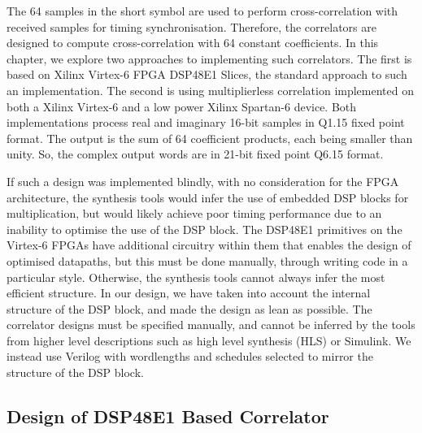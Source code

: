 The 64 samples in the short symbol are used to perform cross-correlation with received samples for timing synchronisation.
Therefore, the correlators are designed to compute cross-correlation with 64 constant coefficients.
In this chapter, we explore two approaches to implementing such correlators.
The first is based on Xilinx Virtex-6 FPGA DSP48E1 Slices, the standard approach to such an implementation.
The second is using multiplierless correlation implemented on both a Xilinx Virtex-6 and a low power Xilinx Spartan-6 device.
Both implementations process real and imaginary 16-bit samples in Q1.15 fixed point format.
The output is the sum of 64 coefficient products, each being smaller than unity.
So, the complex output words are in 21-bit fixed point Q6.15 format.

If such a design was implemented blindly, with no consideration for the FPGA architecture, the synthesis tools would infer the use of embedded DSP blocks for multiplication, but would likely achieve poor timing performance due to an inability to optimise the use of the DSP block.
The DSP48E1 primitives on the Virtex-6 FPGAs have additional circuitry within them that enables the design of optimised datapaths, but this must be done manually, through writing code in a particular style.
Otherwise, the synthesis tools cannot always infer the most efficient structure.
In our design, we have taken into account the internal structure of the DSP block, and made the design as lean as possible.
The correlator designs must be specified manually, and cannot be inferred by the tools from higher level descriptions such as high level synthesis (HLS) or Simulink. We instead use Verilog with wordlengths and schedules selected to mirror the structure of the DSP block.

\subsection{Design of DSP48E1 Based Correlator}

